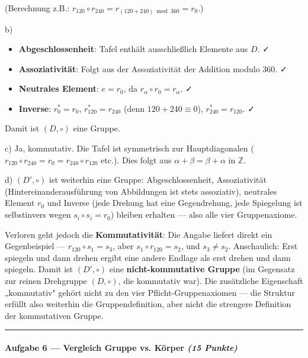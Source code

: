 \documentclass[11pt, a4paper]{article}
\begin{document}
(Berechnung z.B.: $r_{120} \circ r_{240} = r_{(120+240) \bmod 360} = r_0$.)


b)

\begin{itemize}
  \item \textbf{Abgeschlossenheit}: Tafel enthält ausschließlich Elemente aus $D$. ✓
  \item \textbf{Assoziativität}: Folgt aus der Assoziativität der Addition modulo 360. ✓
  \item \textbf{Neutrales Element}: $e = r_0$, da $r_\alpha \circ r_0 = r_\alpha$. ✓
  \item \textbf{Inverse}: $r_0^* = r_0$, $r_{120}^* = r_{240}$ (denn $120+240 \equiv 0$), $r_{240}^* = r_{120}$. ✓
\end{itemize}

Damit ist $(D, \circ)$ eine Gruppe.


c) Ja, kommutativ. Die Tafel ist symmetrisch zur Hauptdiagonalen ($r_{120} \circ r_{240} = r_0 = r_{240} \circ r_{120}$ etc.). Dies folgt aus $\alpha+\beta = \beta+\alpha$ in $\mathbb{Z}$.


d) $(D', \circ)$ ist weiterhin eine Gruppe: Abgeschlossenheit, Assoziativität (Hintereinanderausführung von Abbildungen ist stets assoziativ), neutrales Element $r_0$ und Inverse (jede Drehung hat eine Gegendrehung, jede Spiegelung ist selbstinvers wegen $s_i \circ s_i = r_0$) bleiben erhalten — also alle vier Gruppenaxiome.


Verloren geht jedoch die \textbf{Kommutativität}: Die Angabe liefert direkt ein Gegenbeispiel — $r_{120} \circ s_1 = s_3$, aber $s_1 \circ r_{120} = s_2$, und $s_3 \neq s_2$. Anschaulich: Erst spiegeln und dann drehen ergibt eine andere Endlage als erst drehen und dann spiegeln. Damit ist $(D', \circ)$ eine \textbf{nicht-kommutative Gruppe} (im Gegensatz zur reinen Drehgruppe $(D, \circ)$, die kommutativ war). Die zusätzliche Eigenschaft „kommutativ" gehört nicht zu den vier Pflicht-Gruppenaxiomen — die Struktur erfüllt also weiterhin die Gruppendefinition, aber nicht die strengere Definition der kommutativen Gruppe.



\noindent\textcolor{rulegray}{\rule{\linewidth}{0.4pt}}


\paragraph{Aufgabe 6 — Vergleich Gruppe vs. Körper \textit{(15 Punkte)}}\mbox{}\\[2pt]
\end{document}
